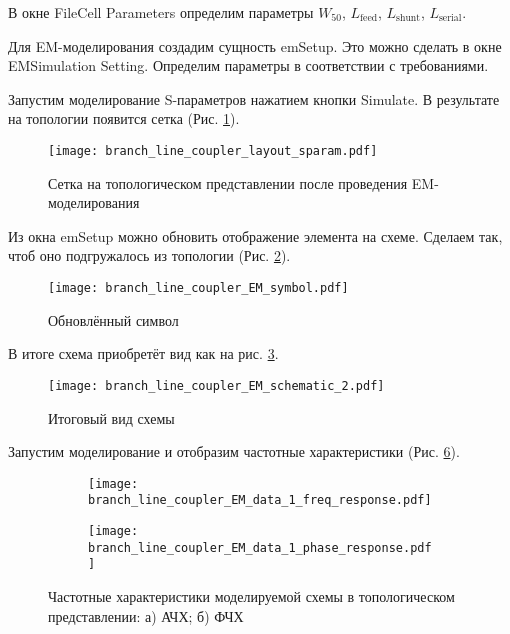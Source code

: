 В окне File\textrightarrow Cell Parameters определим параметры $W_{50}$, $L_\text{feed}$, $L_\text{shunt}$, $L_\text{serial}$.

Для EM-моделирования создадим сущность emSetup.
Это можно сделать в окне EM\textrightarrow Simulation Setting.
Определим параметры в соответствии с требованиями.

Запустим моделирование S-параметров нажатием кнопки Simulate.
В результате на топологии появится сетка (Рис. \ref{fig:branch_line_coupler_layout_sparam}).

\begin{figure}
    \centering
    \texttt{[image: branch\_line\_coupler\_layout\_sparam.pdf]}
    \caption{Сетка на топологическом представлении после проведения EM-моделирования}
    \label{fig:branch_line_coupler_layout_sparam}
\end{figure}

Из окна emSetup можно обновить отображение элемента на схеме.
Сделаем так, чтоб оно подгружалось из топологии (Рис. \ref{fig:branch_line_coupler_EM_symbol}).
\begin{figure}
    \centering
    \texttt{[image: branch\_line\_coupler\_EM\_symbol.pdf]}
    \caption{Обновлённый символ}
    \label{fig:branch_line_coupler_EM_symbol}
\end{figure}
В итоге схема приобретёт вид как на рис. \ref{fig:branch_line_coupler_EM_schematic_2}.
\begin{figure}
    \centering
    \texttt{[image: branch\_line\_coupler\_EM\_schematic\_2.pdf]}
    \caption{Итоговый вид схемы}
    \label{fig:branch_line_coupler_EM_schematic_2}
\end{figure}

Запустим моделирование и отобразим частотные характеристики (Рис. \ref{fig:branch_line_coupler_EM_data_1}).

\begin{figure}[!ht]
    \centering
    \begin{subfigure}[b]{0.45\textwidth}
        \centering
        \texttt{[image: branch\_line\_coupler\_EM\_data\_1\_freq\_response.pdf]}
        \caption{}
        \label{fig:branch_line_coupler_EM_data_1_freq_response}
    \end{subfigure}
    \hfill
    \begin{subfigure}[b]{0.45\textwidth}
        \centering
        \texttt{[image: branch\_line\_coupler\_EM\_data\_1\_phase\_response.pdf]}
        \caption{}
        \label{fig:branch_line_coupler_EM_data_1_phase_response}
    \end{subfigure}
    \caption{
        Частотные характеристики моделируемой схемы в топологическом представлении:
        а) АЧХ;
        б) ФЧХ
    }
    \label{fig:branch_line_coupler_EM_data_1}
\end{figure}
